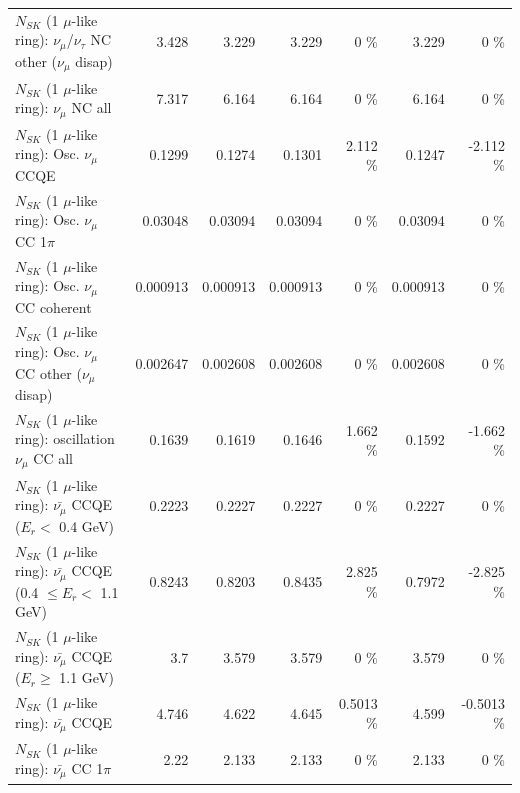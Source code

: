 \begin{table}
\begin{tabular}{| l | r | r | r  r | r  r |}
   $N_{SK}$ (1 $\mu$-like ring): $\nu_\mu$/$\nu_\tau$ NC other ($\nu_\mu$ disap) &           3.428 &           3.229 &           3.229 &        0 \%  &           3.229 &        0 \%  \\ 
                                $N_{SK}$ (1 $\mu$-like ring): $\nu_{\mu}$ NC all &           7.317 &           6.164 &           6.164 &        0 \%  &           6.164 &        0 \%  \\ 
\hline
\hline
                               $N_{SK}$ (1 $\mu$-like ring): Osc. $\nu_\mu$ CCQE &          0.1299 &          0.1274 &          0.1301 &    2.112 \%  &          0.1247 &   -2.112 \%  \\ 
                          $N_{SK}$ (1 $\mu$-like ring): Osc. $\nu_\mu$ CC 1$\pi$ &         0.03048 &         0.03094 &         0.03094 &        0 \%  &         0.03094 &        0 \%  \\ 
                        $N_{SK}$ (1 $\mu$-like ring): Osc. $\nu_\mu$ CC coherent &        0.000913 &        0.000913 &        0.000913 &        0 \%  &        0.000913 &        0 \%  \\ 
         $N_{SK}$ (1 $\mu$-like ring): Osc. $\nu_\mu$ CC other ($\nu_\mu$ disap) &        0.002647 &        0.002608 &        0.002608 &        0 \%  &        0.002608 &        0 \%  \\ 
                      $N_{SK}$ (1 $\mu$-like ring): oscillation $\nu_\mu$ CC all &          0.1639 &          0.1619 &          0.1646 &    1.662 \%  &          0.1592 &   -1.662 \%  \\ 
\hline
\hline
          $N_{SK}$ (1 $\mu$-like ring): $\bar{\nu_\mu}$ CCQE ($E_{r} <$ 0.4 GeV) &          0.2223 &          0.2227 &          0.2227 &        0 \%  &          0.2227 &        0 \%  \\ 
 $N_{SK}$ (1 $\mu$-like ring): $\bar{\nu_\mu}$ CCQE (0.4 $\leq E_{r} <$ 1.1 GeV) &          0.8243 &          0.8203 &          0.8435 &    2.825 \%  &          0.7972 &   -2.825 \%  \\ 
       $N_{SK}$ (1 $\mu$-like ring): $\bar{\nu_\mu}$ CCQE ($E_{r} \geq$ 1.1 GeV) &             3.7 &           3.579 &           3.579 &        0 \%  &           3.579 &        0 \%  \\ 
\hline
                              $N_{SK}$ (1 $\mu$-like ring): $\bar{\nu_\mu}$ CCQE &           4.746 &           4.622 &           4.645 &   0.5013 \%  &           4.599 &  -0.5013 \%  \\ 
                         $N_{SK}$ (1 $\mu$-like ring): $\bar{\nu_\mu}$ CC 1$\pi$ &            2.22 &           2.133 &           2.133 &        0 \%  &           2.133 &        0 \%  \\ 

\end{tabular}
\end{table}
